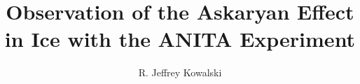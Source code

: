 \documentclass[11pt,final,palatino,thesis,actual]{uhthesis2e} %
\newlength\doublespacelength
\newcommand\startdoublespace{\setlength\baselineskip{\doublespacelength}}
\begin{document}
\title{Observation of the Askaryan Effect in Ice with the ANITA Experiment}
\author{R. Jeffrey Kowalski}

\maketitle

\begin{frontmatter}

\signaturepage %
\copyrightpage %
\tableofcontents %
\listoftables %
\listoffigures %

\end{frontmatter}

\startdoublespace %
\end{document}
